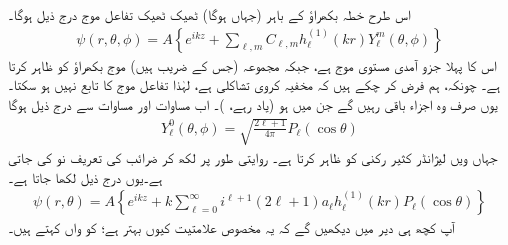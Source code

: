  اس طرح خطہ بکھراؤ کے باہر (جہاں  ہوگا) ٹھیک ٹھیک تفاعل موج درج ذیل ہوگا۔ 
\begin{align}
	\psi(r, \theta, \phi) = A\left\{e^{ikz}+\sum_{\ell, m}C_{\ell, m}h^{(1)}_{\ell}(kr)Y^m_{\ell}(\theta, \phi)\right\}
\end{align}
اس کا پہلا جزو آمدی مستوی موج ہے، جبکہ مجموعہ (جس کے  ضریب   ہیں) موج بکھراؤ کو ظاہر کرتا ہے۔ چونکہ، ہم فرض کر چکے ہیں کہ مخفیہ کروی تشاکلی ہے، لہٰذا تفاعل موج  کا تابع نہیں ہو سکتا۔ یوں صرف وہ اجزاء باقی رہیں گے جن میں  ہو (یاد رہے، )۔ اب مساوات  اور مساوات  سے درج ذیل ہوگا
\begin{align}
	Y^0_{\ell}(\theta, \phi) = \sqrt{\frac{2\ell+1}{4\pi}}P_{\ell}(\cos\theta)
\end{align}
جہاں  ویں لیژانڈر کثیر رکنی کو  ظاہر کرتا ہے۔ روایتی طور پر  لکھ کر ضرائب کی تعریف نو کی جاتی ہے۔یوں درج ذیل لکھا جاتا ہے۔
\begin{align}\label{مساوات_بکھراو_بیرونی_حل}
	\psi(r, \theta) = A\left\{e^{ikz}+k\sum_{\ell=0}^{\infty}i^{\ell+1}(2\ell+1)a_{\ell}h_{\ell}^{(1)}(kr)P_{\ell}(\cos\theta)\right\}
\end{align}
آپ کچھ ہی دیر میں دیکھیں گے کہ یہ مخصوص علامتیت کیوں بہتر ہے؛  کو  واں  کہتے ہیں۔

